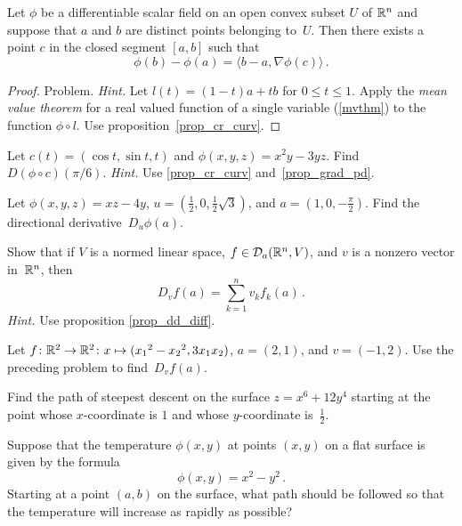 \begin{prop}\label{prop_mvt_sf} Let $\phi$ be a
differentiable scalar field on an open convex subset $U$ of $\mathbb{R}^n$ and suppose that $a$ and
$b$ are distinct points belonging to~$U$.  Then there exists a point $c$ in the closed segment
$[a,b]$ such that
  \[ \phi(b) - \phi(a) = \langle b - a,\nabla\phi(c) \rangle\,. \]
\end{prop}

\begin{proof} Problem.   \emph{Hint.}   Let $l(t) = (1 - t)a + tb$ for $0 \le t \le 1$.  Apply
the \emph{mean value theorem} for a real valued function of a single variable (\ref{mvthm}) to
the function $\phi\circ l$.  Use proposition~\ref{prop_cr_curv}. \ns
\end{proof}

\begin{prob}  Let $c(t) = (\cos t,\sin t,t)$ and $\phi(x,y,z) = x^2y - 3yz$.  Find
$D(\phi\circ c)(\pi/6)$.  \emph{Hint.} Use \ref{prop_cr_curv} and~\ref{prop_grad_pd}.
\end{prob}

\begin{prob}  Let $\phi(x,y,z) = xz - 4y$, $u = (\tfrac12,0,\tfrac12\sqrt3)$, and $a =
(1,0,-\tfrac{\pi}2)$.  Find the directional derivative~$D_u\phi(a)$.
\end{prob}

\begin{prob} Show that if $V$ is a normed linear space, $f \in \mathcal{D}_a(\mathbb{R}^n,V)$, and $v$ is a
nonzero vector in~$\mathbb{R}^n$, then
  \[ D_vf(a) = \sum_{k=1}^nv_kf_k(a)\,. \]
\emph{Hint.}  Use proposition \ref{prop_dd_diff}.
\end{prob}

\begin{prob}  Let $f \colon \mathbb{R}^2 \rightarrow \mathbb{R}^2\colon x \mapsto ({x_1}^2 - {x_2}^2, 3x_1x_2)$,
$a = (2,1)$, and $v = (-1,2)$.  Use the preceding problem to find~$D_vf(a)$.
\end{prob}

\begin{prob}\label{prob_sd}  Find the path of steepest descent on the surface $z = x^6 + 12y^4$
starting at the point whose $x$-coordinate is $1$ and whose $y$-coordinate is~$\frac12$.
\end{prob}

\begin{prob}  Suppose that the temperature $\phi(x,y)$ at points $(x,y)$ on a flat surface is
given by the formula
  \[ \phi(x,y) = x^2 - y^2\,. \]
Starting at a point $(a,b)$ on the surface, what path should be followed so that the
temperature will increase as rapidly as possible?
\end{prob}

